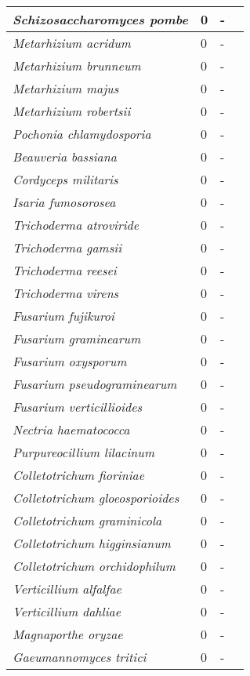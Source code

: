 {\begin{longtable}{| L{4cm} | L{2cm}  | L{5cm} | L{4cm} |}
\textit{Schizosaccharomyces pombe} & 0 & - & \\ \hline
\textit{Metarhizium acridum} & 0 & - & \\ \hline
\textit{Metarhizium brunneum} & 0 & - & \\ \hline
\textit{Metarhizium majus} & 0 & - & \\ \hline
\textit{Metarhizium robertsii} & 0 & - & \\ \hline
\textit{Pochonia chlamydosporia} & 0 & - & \\ \hline
\textit{Beauveria bassiana} & 0 & - & \\ \hline
\textit{Cordyceps militaris} & 0 & - & \\ \hline
\textit{Isaria fumosorosea} & 0 & - & \\ \hline
\textit{Trichoderma atroviride} & 0 & - & \\ \hline
\textit{Trichoderma gamsii} & 0 & - & \\ \hline
\textit{Trichoderma reesei} & 0 & - & \\ \hline
\textit{Trichoderma virens} & 0 & - & \\ \hline
\textit{Fusarium fujikuroi} & 0 & - & \\ \hline
\textit{Fusarium graminearum} & 0 & - & \\ \hline
\textit{Fusarium oxysporum} & 0 & - & \\ \hline
\textit{Fusarium pseudograminearum} & 0 & - & \\ \hline
\textit{Fusarium verticillioides} & 0 & - & \\ \hline
\textit{Nectria haematococca} & 0 & - & \\ \hline
\textit{Purpureocillium lilacinum} & 0 & - & \\ \hline
\textit{Colletotrichum fioriniae} & 0 & - & \\ \hline
\textit{Colletotrichum gloeosporioides} & 0 & - & \\ \hline
\textit{Colletotrichum graminicola} & 0 & - & \\ \hline
\textit{Colletotrichum higginsianum} & 0 & - & \\ \hline
\textit{Colletotrichum orchidophilum} & 0 & - & \\ \hline
\textit{Verticillium alfalfae} & 0 & - & \\ \hline
\textit{Verticillium dahliae} & 0 & - & \\ \hline
\textit{Magnaporthe oryzae} & 0 & - & \\ \hline
\textit{Gaeumannomyces tritici} & 0 & - & \\ \hline

\end{longtable}}
